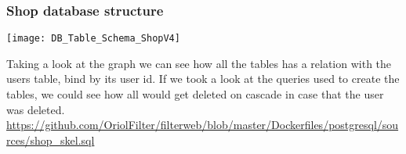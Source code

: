 \newpage
\subsubsection[Shop database structure]{Shop database structure}
\begin{center}
    \texttt{[image: DB\_Table\_Schema\_ShopV4]}
\end{center}
\begin{flushleft}
    Taking a look at the graph we can see how all the tables has a relation with the users table, bind by its user id.
    If we took a look at the queries used to create the tables, we could see how all would get deleted on cascade in case
    that the user was deleted.
    \url{https://github.com/OriolFilter/filterweb/blob/master/Dockerfiles/postgresql/sources/shop_skel.sql}
\end{flushleft}
